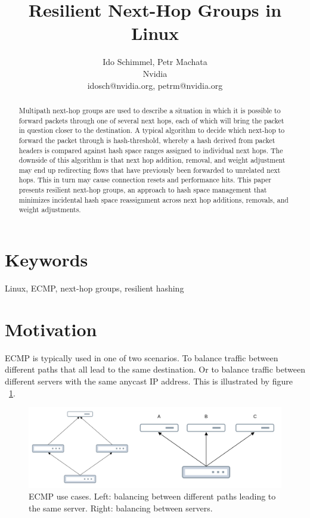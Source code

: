 \documentclass[letterpaper]{article}
\title{Resilient Next-Hop Groups in Linux}
\author{Ido Schimmel, Petr Machata\\
Nvidia\\
idosch@nvidia.org, petrm@nvidia.org\\
\newline
\newline
}
\begin{document}
\maketitle
\begin{abstract}
Multipath next-hop groups are used to describe a situation in which it is
possible to forward packets through one of several next hops, each of which
will bring the packet in question closer to the destination. A typical
algorithm to decide which next-hop to forward the packet through is
hash-threshold, whereby a hash derived from packet headers is compared
against hash space ranges assigned to individual next hops. The downside of
this algorithm is that next hop addition, removal, and weight adjustment
may end up redirecting flows that have previously been forwarded to
unrelated next hops. This in turn may cause connection resets and
performance hits. This paper presents resilient next-hop groups, an
approach to hash space management that minimizes incidental hash space
reassignment across next hop additions, removals, and weight adjustments.
\end{abstract}

\section{Keywords}
Linux, ECMP, next-hop groups, resilient hashing

\section{Motivation}

ECMP is typically used in one of two scenarios. To balance traffic between
different paths that all lead to the same destination. Or to balance
traffic between different servers with the same anycast IP address. This is
illustrated by figure ~\ref{fig:ECMP}.

\begin{figure}[h]
\includegraphics[width=\textwidth]{ECMP.png}
\caption{ECMP use cases. Left: balancing between different paths leading to
  the same server. Right: balancing between servers.}
\label{fig:ECMP}
\end{figure}
\end{document}
